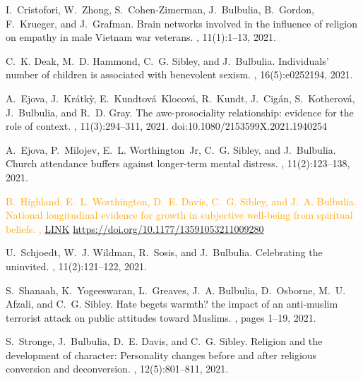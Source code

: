\documentclass{article}
\begin{document}
\begin{thebibliography}{99}
I.~Cristofori, W.~Zhong, S.~Cohen-Zimerman, J.~Bulbulia, B.~Gordon, F.~Krueger,
  and J.~Grafman.
\newblock Brain networks involved in the influence of religion on empathy in
  male Vietnam war veterans.
, 11(1):1--13, 2021.




C.~K. Deak, M.~D. Hammond, C.~G. Sibley, and J.~Bulbulia.
\newblock Individuals' number of children is associated with benevolent sexism.
, 16(5):e0252194, 2021.



A.~Ejova, J.~Kr{\'a}tk{\`y}, E.~Kundtov{\'a}~Klocov{\'a}, R.~Kundt,
  J.~Cig{\'a}n, S.~Kotherov{\'a}, J.~Bulbulia, and R.~D. Gray.
\newblock The awe-prosociality relationship: evidence for the role of context.
, 11(3):294--311, 2021. 
\newblock doi:10.1080/2153599X.2021.1940254

A.~Ejova, P.~Milojev, E.~L. Worthington~Jr, C.~G. Sibley, and J.~Bulbulia.
\newblock Church attendance buffers against longer-term mental distress.
, 11(2):123--138, 2021.



\textcolor{Orange}{B.~Highland, E.~L. Worthington, D.~E. Davis, C.~G. Sibley, and J.~A. Bulbulia.
\newblock National longitudinal evidence for growth in subjective well-being
  from spiritual beliefs.
, \href{https://www.dropbox.com/s/zkzw3x82kqirwyc/13591053211009280.pdf?dl=0}{LINK}
\newblock \href{https://doi.org/10.1177/13591053211009280}{https://doi.org/10.1177/13591053211009280} }

  
U.~Schjoedt, W.~J. Wildman, R.~Sosis, and J.~Bulbulia.
\newblock Celebrating the uninvited.
, 11(2):121--122, 2021.



S.~Shanaah, K.~Yogeeswaran, L.~Greaves, J.~A. Bulbulia, D.~Osborne, M.~U.
  Afzali, and C.~G. Sibley.
\newblock Hate begets warmth? the impact of an anti-muslim terrorist attack on
  public attitudes toward Muslims.
, pages 1--19, 2021.


S.~Stronge, J.~Bulbulia, D.~E. Davis, and C.~G. Sibley.
\newblock Religion and the development of character: Personality changes before
  and after religious conversion and deconversion.
, 12(5):801--811,
  2021.



\end{thebibliography}
\end{document}

